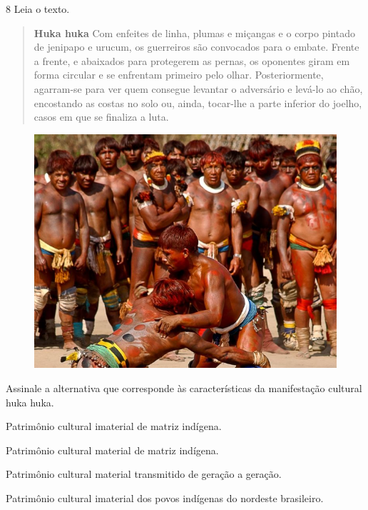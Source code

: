 \num{8}  Leia o texto.

\begin{quote}
\textbf{Huka huka}
Com enfeites de linha, plumas e miçangas e o corpo pintado de jenipapo e
urucum, os guerreiros são convocados para o embate. Frente a frente, e
abaixados para protegerem as pernas, os oponentes
giram em forma circular e se enfrentam primeiro pelo olhar.
Posteriormente, agarram-se para ver quem consegue levantar o adversário
e levá-lo ao chão, encostando as costas no solo ou, ainda, tocar-lhe a
parte inferior do joelho, casos em que se finaliza a luta.
\end{quote}

\begin{figure}[htpb!]
\includegraphics[width=\textwidth]{./imgs/art36.png}
\end{figure}


\noindent{}Assinale a alternativa que corresponde às características da
manifestação cultural huka huka.

\begin{escolha} \enlargethispage{2\baselineskip}
\item
  Patrimônio cultural imaterial de matriz indígena.
\item
  Patrimônio cultural material de matriz indígena.
\item
  Patrimônio cultural material transmitido de geração a geração.
\item
  Patrimônio cultural imaterial dos povos indígenas do nordeste
  brasileiro.
\end{escolha}

